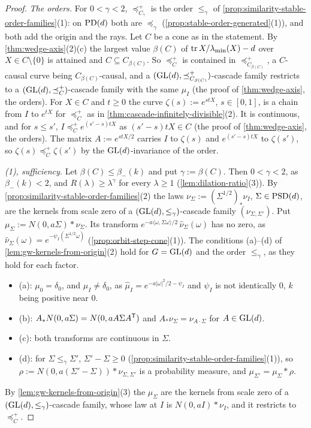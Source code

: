 \begin{proof}
\leanok
\emph{The orders.} For $0 < \gamma < 2$, $\preceq^+_{C_\gamma}$ is the order $\le_\gamma$ of
\ref{prop:similarity-stable-order-families}(1): on $\mathrm{PD}(d)$ both are $\preceq_\gamma$
(\ref{prop:stable-order-generated}(1)), and both add the origin and the rays. Let $C$ be a cone as in the
statement. By \ref{thm:wedge-axis}(2)(c) the largest value $\beta(C)$ of $\operatorname{tr} X/\lambda_{\min}(X) - d$ over
$X \in C \setminus \{0\}$ is attained and $C \subseteq C_{\beta(C)}$. So $\preceq^+_C$ is contained in
$\preceq^+_{C_{\beta(C)}}$, a $C$-causal curve being $C_{\beta(C)}$-causal, and a
$(\mathrm{GL}(d), \preceq^+_{C_{\beta(C)}})$-cascade family restricts to a $(\mathrm{GL}(d), \preceq^+_C)$-cascade family with the
same $\mu_I$ (the proof of \ref{thm:wedge-axis}, the orders). For $X \in C$ and $t \ge 0$ the curve
$\zeta(s) := e^{stX}$, $s \in [0,1]$, is a chain from $I$ to $e^{tX}$ for $\preceq^+_C$ as in
\ref{thm:cascade-infinitely-divisible}(2). It is continuous, and for $s \le s'$, $I \preceq^+_C e^{(s'-s)tX}$
as $(s'-s)tX \in C$ (the proof of \ref{thm:wedge-axis}, the orders). The matrix $A := e^{stX/2}$ carries
$I$ to $\zeta(s)$ and $e^{(s'-s)tX}$ to $\zeta(s')$, so $\zeta(s) \preceq^+_C \zeta(s')$ by the
$\mathrm{GL}(d)$-invariance of the order.

\emph{(1), sufficiency.} Let $\beta(C) \le \beta_-(k)$ and put $\gamma := \beta(C)$. Then $0 < \gamma < 2$, as
$\beta_-(k) < 2$, and $R(\lambda) \ge \lambda^\gamma$ for every $\lambda \ge 1$ (\ref{lem:dilation-ratio}(3)). By
\ref{prop:similarity-stable-order-families}(2) the laws $\nu_\Sigma := (\Sigma^{1/2})_*\nu_I$, $\Sigma \in \mathrm{PSD}(d)$,
are the kernels from scale zero of a $(\mathrm{GL}(d), \le_\gamma)$-cascade family $(\nu_{\Sigma,\Sigma'})$. Put
$\mu_\Sigma := N(0, a\Sigma) * \nu_\Sigma$. Its transform $e^{-a\langle\omega,\Sigma\omega\rangle/2}\,\widehat\nu_\Sigma(\omega)$
has no zero, as $\widehat\nu_\Sigma(\omega) = e^{-\psi_I(\Sigma^{1/2}\omega)}$ (\ref{prop:orbit-step-cone}(1)). The
conditions (a)--(d) of \ref{lem:gw-kernels-from-origin}(2) hold for $G = \mathrm{GL}(d)$ and the order $\le_\gamma$, as
they hold for each factor.
\begin{itemize}
\item (a): $\mu_0 = \delta_0$, and $\mu_I \ne \delta_0$, as $\widehat\mu_I = e^{-a|\omega|^2/2 - \psi_I}$ and $\psi_I$
is not identically $0$, $k$ being positive near $0$.
\item (b): $A_*N(0, a\Sigma) = N(0, aA\Sigma A^{\mathsf{T}})$ and $A_*\nu_\Sigma = \nu_{A\cdot\Sigma}$ for $A \in \mathrm{GL}(d)$.
\item (c): both transforms are continuous in $\Sigma$.
\item (d): for $\Sigma \le_\gamma \Sigma'$, $\Sigma' - \Sigma \ge 0$ (\ref{prop:similarity-stable-order-families}(1)), so
$\rho := N(0, a(\Sigma' - \Sigma)) * \nu_{\Sigma,\Sigma'}$ is a probability measure, and $\mu_{\Sigma'} = \mu_\Sigma * \rho$.
\end{itemize}
By \ref{lem:gw-kernels-from-origin}(3) the $\mu_\Sigma$ are the kernels from scale zero of a
$(\mathrm{GL}(d), \le_\gamma)$-cascade family, whose law at $I$ is $N(0, aI) * \nu_I$, and it restricts to $\preceq^+_C$.


\end{proof}
